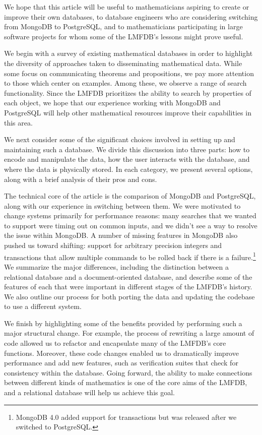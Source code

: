 \documentclass{amsart}
\begin{document}
We hope that this article will be useful to mathematicians aspiring to create or improve their own databases, to database engineers who are considering switching from MongoDB to PostgreSQL, and to mathematicians participating in large software projects for whom some of the LMFDB's lessons might prove useful.

We begin with a survey of existing mathematical databases in order to highlight the diversity of approaches taken to disseminating mathematical data.
While some focus on communicating theorems and propositions, we pay more attention to those which center on examples.
Among these, we observe a range of search functionality.
Since the LMFDB prioritizes the ability to search by properties of each object, we hope that our experience working with MongoDB and PostgreSQL will help other mathematical resources improve their capabilities in this area.

We next consider some of the significant choices involved in setting up and maintaining such a database.
We divide this discussion into three parts: how to encode and manipulate the data, how the user interacts with the database, and where the data is physically stored.
In each category, we present several options, along with a brief analysis of their pros and cons.

The technical core of the article is the comparison of MongoDB and PostgreSQL, along with our experience in switching between them.
We were motivated to change systems primarily for performance reasons: many searches that we wanted to support were timing out on common inputs, and we didn't see a way to resolve the issue within MongoDB.
A number of missing features in MongoDB also pushed us toward shifting: support for arbitrary precision integers and transactions that allow multiple commands to be rolled back if there is a failure.\footnote{MongoDB 4.0 added support for transactions but was released after we switched to PostgreSQL.}
We summarize the major differences, including the distinction between a relational database and a document-oriented database, and describe some of the features of each that were important in different stages of the LMFDB's history.
We also outline our process for both porting the data and updating the codebase to use a different system.

We finish by highlighting some of the benefits provided by performing such a major structural change.
For example, the process of rewriting a large amount of code allowed us to refactor and encapsulate many of the LMFDB's core functions.
Moreover, these code changes enabled us to dramatically improve performance and add new features, such as verification suites that check for consistency within the database.
Going forward, the ability to make connections between different kinds of mathematics is one of the core aims of the LMFDB, and a relational database will help us achieve this goal.
\end{document}
